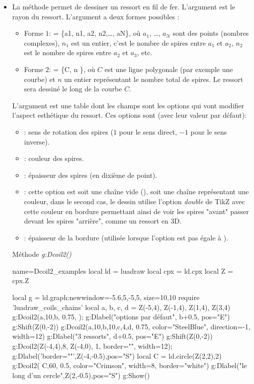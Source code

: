 \begin{itemize}
    \item La méthode  permet de dessiner un ressort en fil de fer. L'argument  est le rayon du ressort. L'argument  a deux formes possibles :
        \begin{itemize}
            \item Forme $1$:  = \{a1, n1, a2, n2,\ldots, aN\}, où $a_1$, \ldots, $a_N$ sont des points (nombres complexes), $n_1$ est un entier, c'est le nombre de spires entre $a_1$ et $a_2$, $n_2$ est le nombre de spires entre $a_2$ et $a_3$, etc.
            \item Forme $2$:  = \{C, n \}, où $C$ est une ligne polygonale (par exemple une courbe) et $n$ un entier représentant le nombre total de spires. Le ressort sera dessiné le long de la courbe $C$.
        \end{itemize}
    L'argument  est une table dont les champs sont les options qui vont modifier l'aspect esthétique du ressort. Ces options sont (avec leur valeur par défaut):
    \begin{itemize}
        \item {} : sens de rotation des spires ($1$ pour le sens direct, $-1$ pour le sens inverse).
        \item {} : couleur des spires.
        \item {} : épaisseur des spires (en dixième de point).
        \item {} : cette option est soit une chaîne vide (), soit une chaîne représentant une couleur, dans le second cas, le dessin utilise l'option \emph{double} de TikZ  avec cette couleur en bordure permettant ainsi de voir les spires "avant" passer devant les spires "arrière", comme un ressort en 3D.
        \item {} : épaisseur de la bordure (utilisée lorsque l'option  est pas égale à \nil).
    \end{itemize}
    
\begin{demo}{Méthode \emph{g:Dcoil2()}}
\begin{luadraw}{name=Dcoil2_examples}
local ld = luadraw
local cpx = ld.cpx
local Z = cpx.Z

local g = ld.graph:new{window={-5.6,5,-5,5}, size={10,10}}
require 'luadraw_coils_chains'
local a, b, c, d = Z(-5,4), Z(-1,4), Z(1,4), Z(3,4)
g:Dcoil2({a,10,b}, 0.75, {}); g:Dlabel("options par défaut", b+0.5, {pos="E"})
g:Shift(Z(0,-2))
g:Dcoil2({a,10,b,10,c,4,d}, 0.75, {color="SteelBlue", direction=-1, width=12})
g:Dlabel("3 ressorts", d+0.5, {pos="E"})
g:Shift(Z(0,-2))
g:Dcoil2({Z(-4,4),8, Z(-4,0)}, 1, {border="", width=12}); g:Dlabel('border=""',Z(-4,-0.5),{pos="S"})
local C = ld.circle(Z(2,2),2)
g:Dcoil2( {C,60}, 0.5, {color="Crimson", width=8, border="white"})
g:Dlabel("le long d'un cercle",Z(2,-0.5),{pos="S"})
g:Show()
\end{luadraw}
\end{demo}
\end{itemize}

